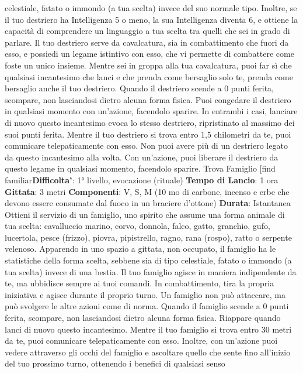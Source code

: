 \begin{multicols}{2}
celestiale, fatato o immondo (a tua scelta) invece del
suo normale tipo. Inoltre, se il tuo destriero ha
Intelligenza 5 o meno, la sua Intelligenza diventa 6, e
ottiene la capacità di comprendere un linguaggio a tua
scelta tra quelli che sei in grado di parlare.
Il tuo destriero serve da cavalcatura, sia in
combattimento che fuori da esso, e possiedi un legame
istintivo con esso, che vi permette di combattere come
foste un unico insieme. Mentre sei in groppa alla tua
cavalcatura, puoi far sì che qualsiasi incantesimo che
lanci e che prenda come bersaglio solo te, prenda
come bersaglio anche il tuo destriero.
Quando il destriero scende a 0 punti ferita, scompare,
non lasciandosi dietro alcuna forma fisica. Puoi
congedare il destriero in qualsiasi momento con
un’azione, facendolo sparire. In entrambi i casi, lanciare
di nuovo questo incantesimo evoca lo stesso destriero,
ripristinato al massimo dei suoi punti ferita.
Mentre il tuo destriero si trova entro 1,5 chilometri da te,
puoi comunicare telepaticamente con esso.
Non puoi avere più di un destriero legato da questo
incantesimo alla volta. Con un’azione, puoi liberare il
destriero da questo legame in qualsiasi momento,
facendolo sparire.
Trova Famiglio
[find familiar\textbf{Difficolta'}:
1° livello, evocazione (rituale)
\textbf{Tempo di Lancio}: 1 ora
\textbf{Gittata}: 3 metri
\textbf{Componenti}: V, S, M (10 mo di carbone, incenso e
erbe che devono essere consumate dal fuoco in un
braciere d’ottone)
\textbf{Durata}: Istantanea
Ottieni il servizio di un famiglio, uno spirito che assume
una forma animale di tua scelta: cavalluccio marino,
corvo, donnola, falco, gatto, granchio, gufo, lucertola,
pesce (frizzo), piovra, pipistrello, ragno, rana (rospo),
ratto o serpente velenoso. Apparendo in uno spazio a
gittata, non occupato, il famiglio ha le statistiche della
forma scelta, sebbene sia di tipo celestiale, fatato o
immondo (a tua scelta) invece di una bestia.
Il tuo famiglio agisce in maniera indipendente da te, ma
ubbidisce sempre ai tuoi comandi. In combattimento,
tira la propria iniziativa e agisce durante il proprio turno.
Un famiglio non può attaccare, ma può svolgere le altre
azioni come di norma.
Quando il famiglio scende a 0 punti ferita, scompare,
non lasciandosi dietro alcuna forma fisica. Riappare
quando lanci di nuovo questo incantesimo.
Mentre il tuo famiglio si trova entro 30 metri da te, puoi
comunicare telepaticamente con esso. Inoltre, con
un’azione puoi vedere attraverso gli occhi del famiglio e
ascoltare quello che sente fino all’inizio del tuo
prossimo turno, ottenendo i benefici di qualsiasi senso

\end{multicols}
